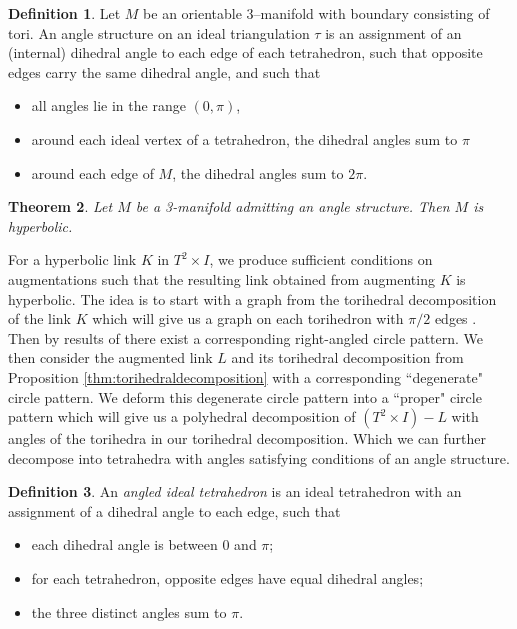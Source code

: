 \documentclass[11pt]{amsart}
\theoremstyle{plain}
\newtheorem{theorem}{Theorem}[section]
\theoremstyle{definition}
\newtheorem{define}[theorem]{Definition}
\begin{document}
\begin{define}
Let $M$ be an orientable 3–manifold with boundary consisting of tori. An angle structure on an ideal triangulation $\tau$ is an assignment of an (internal) dihedral angle to each edge of each tetrahedron, such that opposite
edges carry the same dihedral angle, and such that
\begin{itemize}
\item all angles lie in the range $(0,\pi)$,
\item around each ideal vertex of a tetrahedron, the dihedral angles sum to $\pi$
\item around each edge of $M$, the dihedral angles sum to $2\pi$.
\end{itemize}
\end{define}

\begin{theorem}\cite{Casson-Rivin}\label{thm:Casson-Rivin}
Let $M$ be a 3-manifold admitting an angle structure. Then $M$ is hyperbolic.
\end{theorem}

For a hyperbolic link $K$ in $T^2 \times I$, we produce sufficient conditions on augmentations such that the resulting link obtained from augmenting $K$ is hyperbolic. The idea is to start with a graph from the torihedral decomposition of the link $K$ which will give us a graph on each torihedron with $\pi/2$ edges \cite{CKP2}. Then by results of \cite{BandS} there exist a corresponding right-angled circle pattern. We then consider the augmented link $L$ and its torihedral decomposition from Proposition \ref{thm:torihedraldecomposition} with a corresponding ``degenerate" circle pattern. We deform this degenerate circle pattern into a ``proper" circle pattern which will give us a polyhedral decomposition of $(T^2 \times I)-L$ with angles of the torihedra in our torihedral decomposition. Which we can further decompose into tetrahedra with angles satisfying conditions of an angle structure. 


\begin{define}
An \emph{angled ideal tetrahedron} is an ideal tetrahedron with an assignment of a dihedral angle
to each edge, such that
\begin{itemize}
\item each dihedral angle is between 0 and $\pi$;
\item for each tetrahedron, opposite edges have equal dihedral angles;
\item the three distinct angles sum to $\pi$.
\end{itemize}
\end{define}
\end{document}
